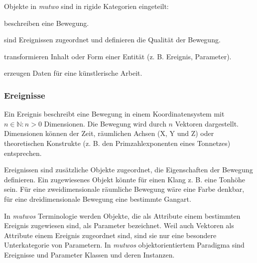 \documentclass[12pt,a4paper,ngerman]{article}
\begin{document}
Objekte in \emph{mutwo} sind in rigide Kategorien eingeteilt:

\bigskip

\hspace{0.5cm}
\begin{minipage}{0.95\textwidth}
    \begin{description}[style=multiline, leftmargin=2.25cm, font=\normalfont\emph]
        \item[Ereignisse] beschreiben eine Bewegung.
        \item[Parameter] sind Ereignissen zugeordnet und definieren die Qualität der Bewegung.
        \item[Übersetzer] transformieren Inhalt oder Form einer Entität (z. B. Ereignis, Parameter).
        \item[Generatoren] erzeugen Daten für eine künstlerische Arbeit.
    \end{description}
\end{minipage}

\subsubsection{Ereignisse}

Ein Ereignis beschreibt eine Bewegung in einem Koordinatensystem mit $n\in\mathbb{N}:n>0$ Dimensionen.
Die Bewegung wird durch $n$ Vektoren dargestellt.
Dimensionen können der Zeit, räumlichen Achsen (X, Y und Z) oder theoretischen Konstrukte (z. B. den Primzahlexponenten eines Tonnetzes) entsprechen.

\bigskip

Ereignissen sind zusätzliche Objekte zugeordnet, die Eigenschaften der Bewegung definieren.
Ein zugewiesenes Objekt könnte für einen Klang z. B. eine Tonhöhe sein.
Für eine zweidimensionale räumliche Bewegung wäre eine Farbe denkbar, für eine dreidimensionale Bewegung eine bestimmte Gangart.

\bigskip

In \emph{mutwos} Terminologie werden Objekte, die als Attribute einem bestimmten Ereignis zugewiesen sind, als Parameter bezeichnet.
Weil auch Vektoren als Attribute einem Ereignis zugeordnet sind, sind sie nur eine besondere Unterkategorie von Parametern.
In \emph{mutwos} objektorientiertem Paradigma sind Ereignisse und Parameter Klassen und deren Instanzen.
\end{document}
